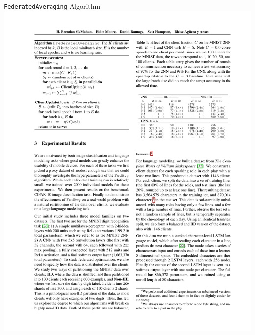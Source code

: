 \documentclass{beamer}{}
\begin{document}
    \begin{frame} {\texttt{FederatedAveraging} Algorithm}
        \center\includegraphics[height=.6\textheight]{img/fedavg.pdf}
    \end{frame}
\end{document}
